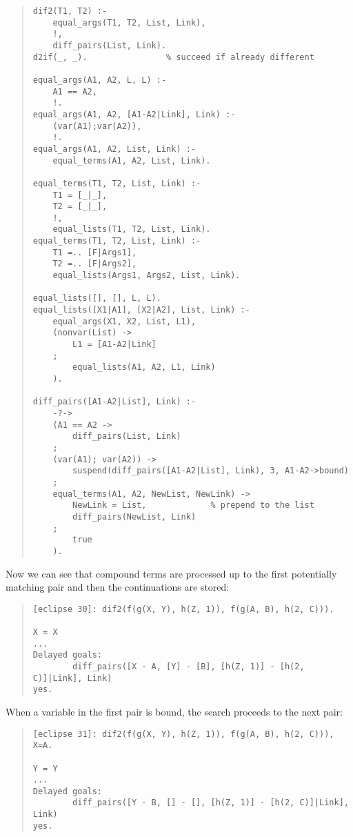 \begin{quote}
\begin{verbatim}
dif2(T1, T2) :-
    equal_args(T1, T2, List, Link),
    !,
    diff_pairs(List, Link).
d2if(_, _).                % succeed if already different

equal_args(A1, A2, L, L) :-
    A1 == A2,
    !.
equal_args(A1, A2, [A1-A2|Link], Link) :-
    (var(A1);var(A2)),
    !.
equal_args(A1, A2, List, Link) :-
    equal_terms(A1, A2, List, Link).

equal_terms(T1, T2, List, Link) :-
    T1 = [_|_],
    T2 = [_|_],
    !,
    equal_lists(T1, T2, List, Link).
equal_terms(T1, T2, List, Link) :-
    T1 =.. [F|Args1],
    T2 =.. [F|Args2],
    equal_lists(Args1, Args2, List, Link).

equal_lists([], [], L, L).
equal_lists([X1|A1], [X2|A2], List, Link) :-
    equal_args(X1, X2, List, L1),
    (nonvar(List) ->
        L1 = [A1-A2|Link]
    ;
        equal_lists(A1, A2, L1, Link)
    ).

diff_pairs([A1-A2|List], Link) :-
    -?->
    (A1 == A2 ->
        diff_pairs(List, Link)
    ;
    (var(A1); var(A2)) ->
        suspend(diff_pairs([A1-A2|List], Link), 3, A1-A2->bound)
    ;
    equal_terms(A1, A2, NewList, NewLink) ->
        NewLink = List,             % prepend to the list
        diff_pairs(NewList, Link)
    ;
        true
    ).
\end{verbatim}
\end{quote}

Now we can see that compound terms are processed up to the first
potentially matching pair and then the continuations
are stored:

\begin{quote}
\begin{verbatim}
[eclipse 30]: dif2(f(g(X, Y), h(Z, 1)), f(g(A, B), h(2, C))).

X = X
...
Delayed goals:
        diff_pairs([X - A, [Y] - [B], [h(Z, 1)] - [h(2, C)]|Link], Link)
yes.
\end{verbatim}
\end{quote}

When a variable in the first pair is bound, the search proceeds
to the next pair:
\begin{quote}
\begin{verbatim}
[eclipse 31]: dif2(f(g(X, Y), h(Z, 1)), f(g(A, B), h(2, C))), X=A.

Y = Y
...
Delayed goals:
        diff_pairs([Y - B, [] - [], [h(Z, 1)] - [h(2, C)]|Link], Link)
yes.
\end{verbatim}
\end{quote}


